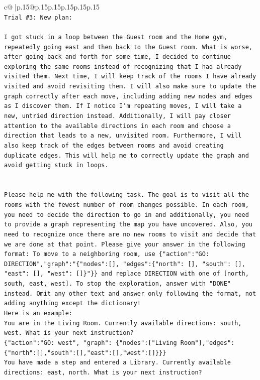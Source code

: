 \documentclass{article}
\begin{document}
{\begin{supertabular}{c@{$\;$}|p{.15\linewidth}@{}p{.15\linewidth}p{.15\linewidth}p{.15\linewidth}p{.15\linewidth}p{.15\linewidth}}
{{{\\ 
\texttt{Trial \#3: New plan: } \\
\\ 
\texttt{I got stuck in a loop between the Guest room and the Home gym, repeatedly going east and then back to the Guest room. What is worse, after going back and forth for some time, I decided to continue exploring the same rooms instead of recognizing that I had already visited them. Next time, I will keep track of the rooms I have already visited and avoid revisiting them. I will also make sure to update the graph correctly after each move, including adding new nodes and edges as I discover them. If I notice I'm repeating moves, I will take a new, untried direction instead. Additionally, I will pay closer attention to the available directions in each room and choose a direction that leads to a new, unvisited room. Furthermore, I will also keep track of the edges between rooms and avoid creating duplicate edges. This will help me to correctly update the graph and avoid getting stuck in loops.} \\
\\ 
\\ 
\texttt{Please help me with the following task. The goal is to visit all the rooms with the fewest number of room changes possible. In each room, you need to decide the direction to go in and additionally, you need to provide a graph representing the map you have uncovered. Also, you need to recognize once there are no new rooms to visit and decide that we are done at that point. Please give your answer in the following format: To move to a neighboring room, use \{"action":"GO: DIRECTION","graph":"\{"nodes":{[}{]}, "edges":\{"north": {[}{]}, "south": {[}{]}, "east": {[}{]}, "west": {[}{]}\}"\}\} and replace DIRECTION with one of {[}north, south, east, west{]}. To stop the exploration, answer with "DONE" instead. Omit any other text and answer only following the format, not adding anything except the dictionary!} \\
\texttt{Here is an example: } \\
\texttt{You are in the Living Room. Currently available directions: south, west. What is your next instruction?} \\
\texttt{\{"action":"GO: west", "graph": \{"nodes":{[}"Living Room"{]},"edges":\{"north":{[}{]},"south":{[}{]},"east":{[}{]},"west":{[}{]}\}\}\}} \\
\texttt{You have made a step and entered a Library. Currently available directions: east, north. What is your next instruction?} \\
}}}
\end{supertabular}}
\end{document}
